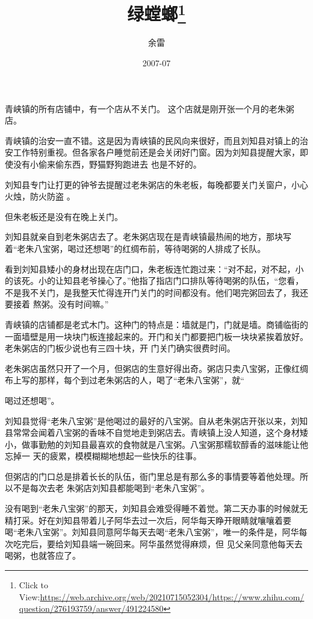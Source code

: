 \documentclass{article}
\title{绿螳螂\footnote{Click to View:\url{https://web.archive.org/web/20210715052304/https://www.zhihu.com/question/276193759/answer/491224580}}}
\author{余雷}
\date{2007-07}
\begin{document}

\maketitle


\Large

﻿青峡镇的所有店铺中，有一个店从不关门。
这个店就是刚开张一个月的老朱粥店。 

青峡镇的治安一直不错。这是因为青峡镇的民风向来很好，而且刘知县对镇上的治安工作特别重视。但各家各户睡觉前还是会关闭好门窗。因为刘知县提醒大家，即使没有小偷来偷东西，野猫野狗跑进去
也是不好的。 

刘知县专门让打更的钟爷去提醒过老朱粥店的朱老板，每晚都要关门关窗户，小心火烛，防火防盗
。 


但朱老板还是没有在晚上关门。 

\newpage

刘知县就亲自到老朱粥店去了。老朱粥店现在是青峡镇最热闹的地方，那块写着“老朱八宝粥，喝过还想喝”的红绸布前，等待喝粥的人排成了长队。
 

看到刘知县矮小的身材出现在店门口，朱老板连忙跑过来：“对不起，对不起，小的该死。小的让知县老爷操心了。”他指了指店门口排队等待喝粥的队伍，“您看，不是我不关门，是我整天忙得连开门关门的时间都没有。他们喝完粥回去了，我还要接着
熬粥。没有时间嘛。” 

青峡镇的店铺都是老式木门。这种门的特点是：墙就是门，门就是墙。商铺临街的一面墙壁是用一块块门板连接起来的。开门和关门都要把门板一块块紧挨着放好。老朱粥店的门板少说也有三四十块，开
门关门确实很费时间。 

老朱粥店虽然只开了一个月，但粥店的生意好得出奇。粥店只卖八宝粥，正像红绸布上写的那样，每个到过老朱粥店的人，喝了“老朱八宝粥”，就“
\newpage

喝过还想喝”。 

刘知县觉得“老朱八宝粥”是他喝过的最好的八宝粥。自从老朱粥店开张以来，刘知县常常会闻着八宝粥的香味不自觉地走到粥店去。青峡镇上没人知道，这个身材矮小，做事勤勉的刘知县最喜欢的食物就是八宝粥。八宝粥那糯软醇香的滋味能让他忘掉一
天的疲累，模模糊糊地想起一些快乐的往事。 

但粥店的门口总是排着长长的队伍，衙门里总是有那么多的事情要等着他处理。所以不是每次去老
朱粥店刘知县都能喝到“老朱八宝粥”。 

没有喝到“老朱八宝粥”的那天，刘知县会难受得睡不着觉。第二天办事的时候就无精打采。好在刘知县带着儿子阿华去过一次后，阿华每天睁开眼睛就嚷嚷着要喝“老朱八宝粥”。刘知县同意阿华每天去喝“老朱八宝粥”，唯一的条件是，阿华每次吃完后，要给刘知县端一碗回来。阿华虽然觉得麻烦，但
见父亲同意他每天去喝粥，也就答应了。 
\end{document}
